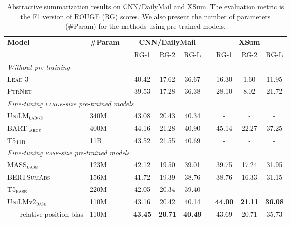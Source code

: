 \documentclass{article}
\newcommand{\bartlarge}{BART$_{\textsc{large}}$}
\newcommand{\vonelarge}{\textsc{UniLM}$_{\textsc{large}}$}
\newcommand{\vtwobase}{\textsc{UniLM}v2$_{\textsc{base}}$}
\newcommand\norelposfull{-- relative position bias}
\begin{document}
\begin{table*}[t]
\centering
\begin{tabular}{lllccclccc}
\toprule
\multirow{2}{*}{\bf Model}                          & \multirow{2}{*}{\bf \#Param} & & \multicolumn{3}{c}{\bf CNN/DailyMail} & & \multicolumn{3}{c}{\bf XSum} \\
&                              & & RG-1  & RG-2  &      RG-L      & & RG-1  & RG-2  &     RG-L     \\ \midrule
\multicolumn{8}{l}{\textit{Without pre-training}} & & \\
\textsc{Lead}-3 &                                                         & & 40.42 & 17.62 &     36.67      & & 16.30 & 1.60  &    11.95     \\
\textsc{PtrNet}~\cite{see-2017-get} &                                      & & 39.53 & 17.28 &     36.38      & & 28.10 & 8.02  &    21.72     \\ \midrule
\multicolumn{8}{l}{\textit{Fine-tuning \textsc{large}-size pre-trained models}} & & \\
\vonelarge{}~\cite{unilm}                                        & 340M                         & & 43.08 & 20.43 &     40.34      & &   -   &   -   &      -       \\
\bartlarge{}~\cite{bart}                                        & 400M                         & & 44.16 & 21.28 &     40.90      & & 45.14 & 22.27 &    37.25     \\
{T5$_{\textsc{11B}}$}~\cite{t5}                               & 11B                          & & 43.52 & 21.55 & 40.69 & &   -   &   -   &      -       \\  \midrule
\multicolumn{8}{l}{\textit{Fine-tuning \textsc{base}-size pre-trained models}} & & \\
{MASS$_{\textsc{base}}$}~\cite{mass}                            & 123M                         & & 42.12 & 19.50 &     39.01      & & 39.75 & 17.24 &    31.95     \\
\textsc{BERTSumAbs}~\cite{bertsum}                                 & 156M                         & & 41.72 & 19.39 &     38.76      & & 38.76 & 16.33 &    31.15     \\
{T5$_{\textsc{base}}$}~\cite{t5}                              & 220M                         & &   42.05 & 20.34 & 39.40        & &   -   &   -   &      -       \\
\vtwobase{}                                         & 110M                         & &   {43.16} & {20.42} & {40.14} & & \textbf{44.00} & \textbf{21.11} & \textbf{36.08}     \\
~~\norelposfull{}                                         & 110M                         & &   \textbf{43.45} & \textbf{20.71} & \textbf{40.49} & & 43.69 & 20.71 &    35.73     \\
\bottomrule
\end{tabular}
\caption{
Abstractive summarization results on CNN/DailyMail and XSum.
The evaluation metric is the F1 version of ROUGE (RG) scores.
We also present the number of parameters (\#Param) for the methods using pre-trained models.
}
\label{tbl:summ:base}
\end{table*}
\end{document}
